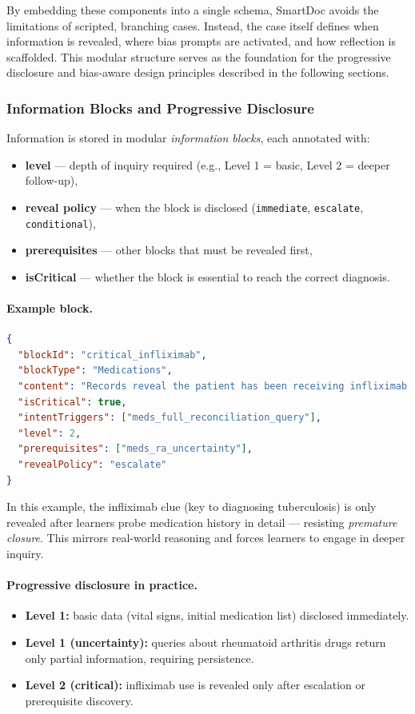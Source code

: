 By embedding these components into a single schema, SmartDoc avoids the limitations of
scripted, branching cases. Instead, the case itself defines when information is revealed,
where bias prompts are activated, and how reflection is scaffolded. This modular structure
serves as the foundation for the progressive disclosure and bias-aware design principles
described in the following sections.


\subsubsection{Information Blocks and Progressive Disclosure}

Information is stored in modular \emph{information blocks}, each annotated with:
\begin{itemize}
    \item \textbf{level} — depth of inquiry required (e.g., Level 1 = basic, Level 2 = deeper follow-up),
    \item \textbf{reveal policy} — when the block is disclosed (\texttt{immediate}, \texttt{escalate}, \texttt{conditional}),
    \item \textbf{prerequisites} — other blocks that must be revealed first,
    \item \textbf{isCritical} — whether the block is essential to reach the correct diagnosis.
\end{itemize}

\paragraph{Example block.}
\begin{lstlisting}[language=json]
{
  "blockId": "critical_infliximab",
  "blockType": "Medications",
  "content": "Records reveal the patient has been receiving infliximab for rheumatoid arthritis.",
  "isCritical": true,
  "intentTriggers": ["meds_full_reconciliation_query"],
  "level": 2,
  "prerequisites": ["meds_ra_uncertainty"],
  "revealPolicy": "escalate"
}
\end{lstlisting}

In this example, the infliximab clue (key to diagnosing tuberculosis) is only revealed
after learners probe medication history in detail — resisting \emph{premature closure}.
This mirrors real-world reasoning and forces learners to engage in deeper inquiry.

\paragraph{Progressive disclosure in practice.}
\begin{itemize}
    \item \textbf{Level 1:} basic data (vital signs, initial medication list) disclosed immediately.
    \item \textbf{Level 1 (uncertainty):} queries about rheumatoid arthritis drugs return
    only partial information, requiring persistence.
    \item \textbf{Level 2 (critical):} infliximab use is revealed only after escalation or
    prerequisite discovery.
\end{itemize}

